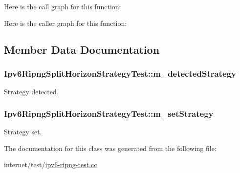 Here is the call graph for this function\+:




Here is the caller graph for this function\+:




\subsection{Member Data Documentation}
\subsubsection[{\texorpdfstring{m\+\_\+detected\+Strategy}{m_detectedStrategy}}]{ Ipv6\+Ripng\+Split\+Horizon\+Strategy\+Test\+::m\+\_\+detected\+Strategy\hspace{0.3cm}{\ttfamily [private]}}\hypertarget{classIpv6RipngSplitHorizonStrategyTest_a67c77e54ff8eccc14b3d197dbff2a8f7}{}\label{classIpv6RipngSplitHorizonStrategyTest_a67c77e54ff8eccc14b3d197dbff2a8f7}


Strategy detected. 

\subsubsection[{\texorpdfstring{m\+\_\+set\+Strategy}{m_setStrategy}}]{ Ipv6\+Ripng\+Split\+Horizon\+Strategy\+Test\+::m\+\_\+set\+Strategy\hspace{0.3cm}{\ttfamily [private]}}\hypertarget{classIpv6RipngSplitHorizonStrategyTest_a5c2358f181884a3e4edbe045f839246a}{}\label{classIpv6RipngSplitHorizonStrategyTest_a5c2358f181884a3e4edbe045f839246a}


Strategy set. 



The documentation for this class was generated from the following file\+:\begin{DoxyCompactItemize}
\item 
internet/test/\hyperlink{ipv6-ripng-test_8cc}{ipv6-\/ripng-\/test.\+cc}\end{DoxyCompactItemize}
